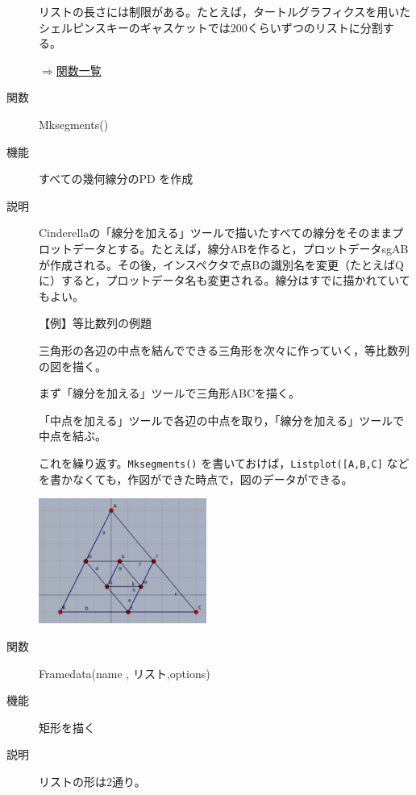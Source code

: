 \documentclass[papersize,a4paper,12pt,uplatex]{jsarticle}
\begin{document}
\begin{description}
\vspace{\baselineskip}
 リストの長さには制限がある。たとえば，タートルグラフィクスを用いたシェルピンスキーのギャスケットでは200くらいずつのリストに分割する。
 
 \hspace{20mm}\scalebox{0.8}{ }
\begin{flushright}\hyperlink{functionlist}{$\Rightarrow$関数一覧}\end{flushright}

\vspace{\baselineskip}
\hypertarget{mksegments}{}
\item[関数]Mksegments()
\item[機能]すべての幾何線分のPD を作成
\item[説明]Cinderellaの「線分を加える」ツールで描いたすべての線分をそのままプロットデータとする。たとえば，線分ABを作ると，プロットデータsgABが作成される。その後，インスペクタで点Bの識別名を変更（たとえばQに）すると，プロットデータ名も変更される。線分はすでに描かれていてもよい。

\vspace{\baselineskip}
【例】等比数列の例題

三角形の各辺の中点を結んでできる三角形を次々に作っていく，等比数列の図を描く。

まず「線分を加える」ツールで三角形ABCを描く。

「中点を加える」ツールで各辺の中点を取り，「線分を加える」ツールで中点を結ぶ。

これを繰り返す。\verb|Mksegments()| を書いておけば，\verb|Listplot([A,B,C]| などを書かなくても，作図ができた時点で，図のデータができる。

\includegraphics[bb=0.00 0.00 438.02 327.02,width=5.5cm]{Fig/gpro01.pdf} 

\vspace{\baselineskip}
\hypertarget{framedata}{}
\item[関数]Framedata(name , リスト,options)
\item[機能]矩形を描く
\item[説明]リストの形は2通り。


\end{description}
\end{document}

